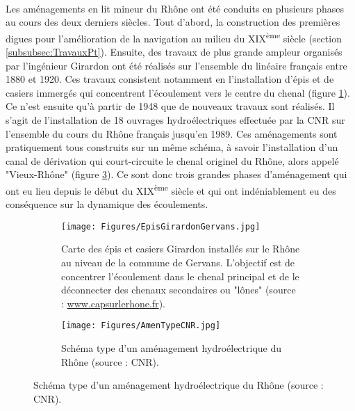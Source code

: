 \documentclass[11pt]{article}
\begin{document}
	\paragraph{} Les aménagements en lit mineur du Rhône ont été conduits en plusieurs phases au cours des deux derniers siècles. Tout d'abord, la construction des premières digues pour l'amélioration de la navigation au milieu du XIX\textsuperscript{ème} siècle (section \ref{subsubsec:TravauxPt}). Ensuite, des travaux de plus grande ampleur organisés par l'ingénieur Girardon ont été réalisés sur l'ensemble du linéaire français entre 1880 et 1920. Ces travaux consistent notamment en l'installation d'épis et de casiers immergés qui concentrent l'écoulement vers le centre du chenal (figure \ref{subfig:Girardon}). Ce n'est ensuite qu'à partir de 1948 que de nouveaux travaux sont réalisés. Il s'agit de l'installation de 18 ouvrages hydroélectriques effectuée par la CNR sur l'ensemble du cours du Rhône français jusqu'en 1989. Ces aménagements sont pratiquement tous construits sur un même schéma, à savoir l'installation d'un canal de dérivation qui court-circuite le chenal originel du Rhône, alors appelé "Vieux-Rhône" (figure \ref{subfig:SchemaCNR}). Ce sont donc trois grandes phases d'aménagement qui ont eu lieu depuis le début du XIX\textsuperscript{ème} siècle et qui ont indéniablement eu des conséquence sur la dynamique des écoulements. 
	
	\begin{figure}[h!]
		\centering
		\begin{subfigure}{0.7\linewidth}
		\texttt{[image: Figures/EpisGirardonGervans.jpg]}
		\caption{Carte des épis et casiers Girardon installés sur le Rhône au niveau de la commune de Gervans. L'objectif est de concentrer l'écoulement dans le chenal principal et de le déconnecter des chenaux secondaires ou "lônes" (source : \url{www.capsurlerhone.fr}).}
		\label{subfig:Girardon}
		\end{subfigure}	
		\begin{subfigure}{0.5\linewidth}
		\centering
		\texttt{[image: Figures/AmenTypeCNR.jpg]}
		\caption{Schéma type d'un aménagement hydroélectrique du Rhône (source : CNR).}
		\label{subfig:SchemaCNR}
		\end{subfigure}	
	\end{figure}		
\end{document}
